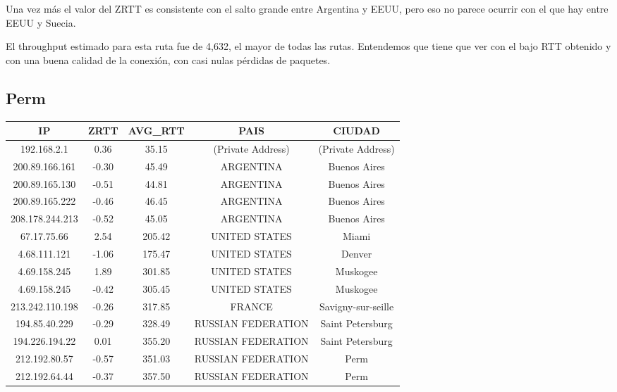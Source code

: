  Una vez más el valor del ZRTT es consistente con el salto grande entre Argentina y EEUU, pero eso no parece ocurrir con el que hay entre EEUU y Suecia.
 
 El throughput estimado para esta ruta fue de 4,632, el mayor de todas las rutas. Entendemos que tiene que ver con el bajo RTT obtenido y con una buena calidad de la conexión, con casi nulas pérdidas de paquetes.
 
\subsection{Perm}

\begin{tabular}{|c@{\hspace{5ex}}c@{\hspace{5ex}}c@{\hspace{5ex}}c@{\hspace{5ex}}c|}
 \hline
 \rule{0pt}{1.2em}IP & ZRTT & AVG\_RTT & PAIS & CIUDAD\\[0.2em]
 \hline

\rule{0pt}{1.2em} 192.168.2.1  &  0.36 & 35.15 & (Private Address) & (Private Address) \\[0.2em]
\rule{0pt}{1.2em} 200.89.166.161  &  -0.30 & 45.49 & ARGENTINA & Buenos Aires \\[0.2em]
\rule{0pt}{1.2em} 200.89.165.130  &  -0.51 & 44.81 & ARGENTINA & Buenos Aires \\[0.2em]
\rule{0pt}{1.2em} 200.89.165.222  &  -0.46 & 46.45 & ARGENTINA & Buenos Aires \\[0.2em]
\rule{0pt}{1.2em} 208.178.244.213  &  -0.52 & 45.05 & ARGENTINA & Buenos Aires \\[0.2em]
\rule{0pt}{1.2em} 67.17.75.66  &  2.54 & 205.42 & UNITED STATES & Miami \\[0.2em]
\rule{0pt}{1.2em} 4.68.111.121  &  -1.06 & 175.47 & UNITED STATES & Denver \\[0.2em]
\rule{0pt}{1.2em} 4.69.158.245  &  1.89 & 301.85 & UNITED STATES & Muskogee \\[0.2em]
\rule{0pt}{1.2em} 4.69.158.245  &  -0.42 & 305.45 & UNITED STATES & Muskogee \\[0.2em]
\rule{0pt}{1.2em} 213.242.110.198  &  -0.26 & 317.85 & FRANCE & Savigny-sur-seille \\[0.2em]
\rule{0pt}{1.2em} 194.85.40.229  &  -0.29 & 328.49 & RUSSIAN FEDERATION & Saint Petersburg \\[0.2em]
\rule{0pt}{1.2em} 194.226.194.22  &  0.01 & 355.20 & RUSSIAN FEDERATION & Saint Petersburg \\[0.2em]
\rule{0pt}{1.2em} 212.192.80.57  &  -0.57 & 351.03 & RUSSIAN FEDERATION & Perm \\[0.2em]
\rule{0pt}{1.2em} 212.192.64.44  &  -0.37 & 357.50 & RUSSIAN FEDERATION & Perm \\[0.2em]
\hline
 \end{tabular}
 

